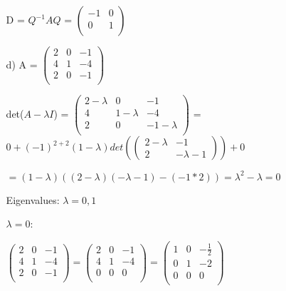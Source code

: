 \documentclass[12pt]{article}
\begin{document}
\begin{enumerate}
\begin{enumerate}[label=(\alph*)]
            D = $Q^{-1}AQ$ = $\begin{pmatrix}
                -1 & 0 \\
                0 & 1 \\
            \end{pmatrix}$

        \item[d)] A = $\begin{pmatrix}
            2 & 0 & -1 \\
            4 & 1 & -4\\
            2 & 0 & -1 \\
        \end{pmatrix}$

        det($A - \lambda I$) = $\begin{pmatrix}
            2 - \lambda & 0 & -1 \\
            4 & 1 - \lambda & -4\\
            2 & 0 & -1 - \lambda\\
        \end{pmatrix}$ = \\ $0 + (-1)^{2 + 2}(1 - \lambda)det(\begin{pmatrix}
            2 - \lambda & -1 \\
            2 & -\lambda - 1
        \end{pmatrix}) + 0$

        
        $= (1 - \lambda)((2 - \lambda)(-\lambda - 1) - (-1 * 2)) = \lambda^2 - \lambda = 0$

        Eigenvalues: $\lambda = 0, 1$

        $\lambda = 0$: 
        
        $\begin{pmatrix}
            2 & 0 & -1 \\
            4 & 1 & -4\\
            2 & 0 & -1 \\
        \end{pmatrix} = \begin{pmatrix}
            2 & 0 & -1 \\
            4 & 1 & -4\\
            0 & 0 & 0\\
        \end{pmatrix} = \begin{pmatrix}
            1 & 0 & -\frac{1}{2} \\
            0 & 1 & -2\\
            0 & 0 & 0\\
        \end{pmatrix}$


\end{enumerate}
\end{enumerate}
\end{document}
